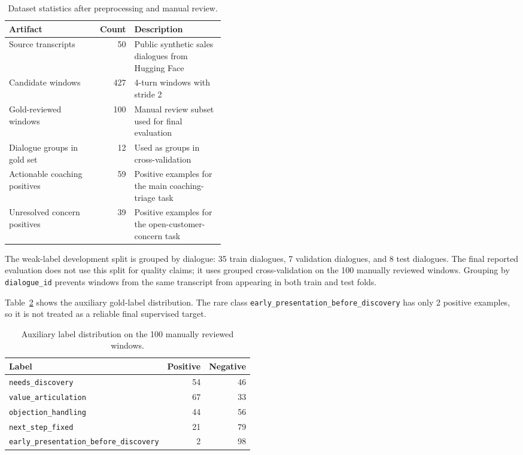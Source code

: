 \documentclass{article}
\begin{document}
\begin{table}[!tbh]
    \centering
    \begin{tabular}{lrp{0.42\linewidth}}
        \toprule
        Artifact & Count & Description \\
        \midrule
        Source transcripts & 50 & Public synthetic sales dialogues from Hugging Face \\
        Candidate windows & 427 & 4-turn windows with stride 2 \\
        Gold-reviewed windows & 100 & Manual review subset used for final evaluation \\
        Dialogue groups in gold set & 12 & Used as groups in cross-validation \\
        Actionable coaching positives & 59 & Positive examples for the main coaching-triage task \\
        Unresolved concern positives & 39 & Positive examples for the open-customer-concern task \\
        \bottomrule
    \end{tabular}
    \caption{Dataset statistics after preprocessing and manual review.}
    \label{tab:data-stats}
\end{table}

The weak-label development split is grouped by dialogue: 35 train dialogues, 7 validation dialogues, and 8 test dialogues. The final reported evaluation does not use this split for quality claims; it uses grouped cross-validation on the 100 manually reviewed windows. Grouping by \texttt{dialogue\_id} prevents windows from the same transcript from appearing in both train and test folds.

Table~\ref{tab:aux-labels} shows the auxiliary gold-label distribution. The rare class \texttt{early\_presentation\_before\_discovery} has only 2 positive examples, so it is not treated as a reliable final supervised target.

\begin{table}[!tbh]
    \centering
    \begin{tabular}{lrr}
        \toprule
        Label & Positive & Negative \\
        \midrule
        \texttt{needs\_discovery} & 54 & 46 \\
        \texttt{value\_articulation} & 67 & 33 \\
        \texttt{objection\_handling} & 44 & 56 \\
        \texttt{next\_step\_fixed} & 21 & 79 \\
        \texttt{early\_presentation\_before\_discovery} & 2 & 98 \\
        \bottomrule
    \end{tabular}
    \caption{Auxiliary label distribution on the 100 manually reviewed windows.}
    \label{tab:aux-labels}
\end{table}
\end{document}
